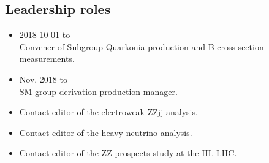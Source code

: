\subsection{Leadership roles}
\begin{itemize}
  \item 2018-10-01 to
        \\
        Convener of Subgroup Quarkonia production and B cross-section measurements.
  \item Nov. 2018 to
        \\
        SM group derivation production manager.
  \item Contact editor of the electroweak ZZjj analysis.
  \item Contact editor of the heavy neutrino analysis.
  \item Contact editor of the ZZ prospects study at the HL-LHC.
\end{itemize}



















